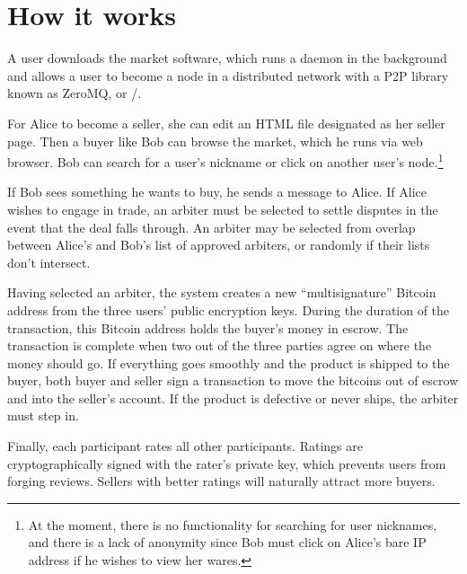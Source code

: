 \documentclass[11pt,twocolumn]{article}
\begin{document}
\section{How it works}
A user downloads the market software, which runs a daemon in the background and allows a user to become a node in a distributed network with a P2P library known as ZeroMQ, or \ZMQ/. 

For Alice to become a seller, she can edit an HTML file designated as her seller page.
Then a buyer like Bob can browse the market, which he runs via web browser.
Bob can search for a user's nickname or click on another user's node.\footnote{At the moment, there is no functionality for searching for user nicknames, and there is a lack of anonymity since Bob must click on Alice's bare IP address if he wishes to view her wares.}

If Bob sees something he wants to buy, he sends a message to Alice.
If Alice wishes to engage in trade, an arbiter must be selected to settle disputes in the event that the deal falls through.
An arbiter may be selected from overlap between Alice's and Bob's list of approved arbiters, or randomly if their lists don't intersect.

Having selected an arbiter, the system creates a new ``multisignature'' Bitcoin address from the three users' public encryption keys.
During the duration of the transaction, this Bitcoin address holds the buyer's money in escrow.
The transaction is complete when two out of the three parties agree on where the money should go.
If everything goes smoothly and the product is shipped to the buyer, both buyer and seller sign a transaction to move the bitcoins out of escrow and into the seller's account.
If the product is defective or never ships, the arbiter must step in.

Finally, each participant rates all other participants.
Ratings are cryptographically signed with the rater's private key, which prevents users from forging reviews.
Sellers with better ratings will naturally attract more buyers. 






\end{document}
